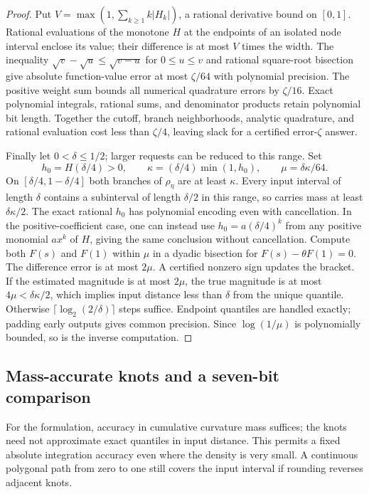 \begin{proof}
Put $V=\max(1,\sum_{k\ge1}k|H_k|)$, a rational derivative bound
on $[0,1]$. Rational evaluations of the monotone $H$ at the endpoints
of an isolated node interval enclose its value; their difference is at
most $V$ times the width. The inequality
$\sqrt v-\sqrt u\le\sqrt{v-u}$ for $0\le u\le v$ and rational
square-root bisection give absolute function-value error at most
$\zeta/64$ with polynomial precision. The positive weight sum bounds
all numerical quadrature errors by $\zeta/16$. Exact polynomial
integrals, rational sums, and denominator products retain polynomial
bit length. Together the cutoff, branch neighborhoods, analytic
quadrature, and rational evaluation cost less than $\zeta/4$, leaving
slack for a certified error-$\zeta$ answer.

Finally let $0<\delta\le1/2$; larger requests can be reduced to this
range. Set
\begin{equation}\label{eq:quantile-inverse-modulus}
 h_0=H(\delta/4)>0,\qquad
 \kappa=(\delta/4)\min(1,h_0),\qquad
 \mu=\delta\kappa/64.
\end{equation}
On $[\delta/4,1-\delta/4]$ both branches of $\rho_\eta$ are at
least $\kappa$. Every input interval of length $\delta$ contains a
subinterval of length $\delta/2$ in this range, so carries mass at
least $\delta\kappa/2$. The exact rational $h_0$ has polynomial
encoding even with cancellation. In the positive-coefficient case,
one can instead use $h_0=a(\delta/4)^k$ from any positive monomial
$a x^k$ of $H$, giving the same conclusion without cancellation.
Compute both $F(s)$ and $F(1)$ within $\mu$ in a dyadic bisection
for $F(s)-\theta F(1)=0$. The difference error is at most $2\mu$.
A certified nonzero sign updates the bracket. If the estimated
magnitude is at most $2\mu$, the true magnitude is at most
$4\mu<\delta\kappa/2$, which implies input distance less than
$\delta$ from the unique quantile. Otherwise
$\lceil\log_2(2/\delta)\rceil$ steps suffice. Endpoint quantiles
are handled exactly; padding early outputs gives common precision.
Since $\log(1/\mu)$ is polynomially bounded, so is the inverse
computation.
\end{proof}

\subsection{Mass-accurate knots and a seven-bit comparison}

For the formulation, accuracy in cumulative curvature mass suffices;
the knots need not approximate exact quantiles in input distance.
This permits a fixed absolute integration accuracy even where the
density is very small. A continuous polygonal path from zero to one
still covers the input interval if rounding reverses adjacent knots.

